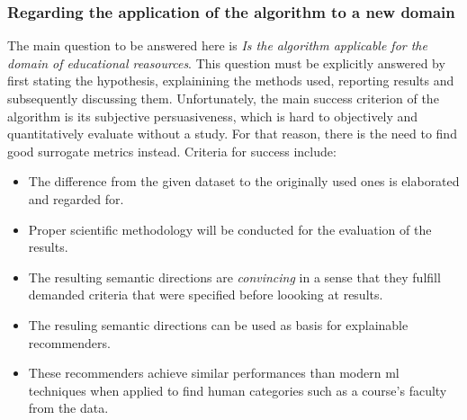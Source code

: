 \subsubsection*{Regarding the application of the algorithm to a new domain}

The main question to be answered here is \textit{Is the algorithm applicable for the domain of educational reasources}. This question must be explicitly answered by first stating the hypothesis, explainining the methods used, reporting results and subsequently discussing them. Unfortunately, the main success criterion of the algorithm is its subjective persuasiveness, which is hard to objectively and quantitatively evaluate without a study. For that reason, there is the need to find good surrogate metrics instead. Criteria for success include:

\begin{itemize}
	\item The difference from the given dataset to the originally used ones is elaborated and regarded for.
	\item Proper scientific methodology will be conducted for the evaluation of the results.
	\item The resulting semantic directions are \textit{convincing} in a sense that they fulfill demanded criteria that were specified before loooking at results.
	\item The resuling semantic directions can be used as basis for explainable recommenders.
	\item These recommenders achieve similar performances than modern \gls{ml} techniques when applied to find human categories such as a course's faculty from the data.
\end{itemize}


